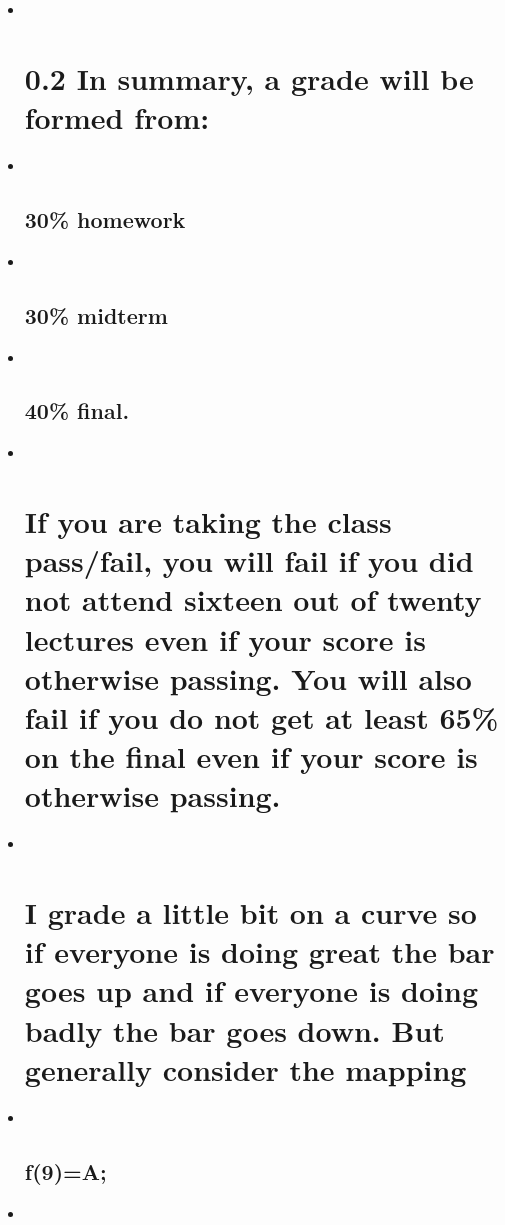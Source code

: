 \documentclass[11pt]{article}
\begin{document}
    \begin{itemize}
\item ~
  \section{0.2 In summary, a grade will be formed
  from:}\label{in-summary-a-grade-will-be-formed-from}
\item ~
  \subsection{30\% homework}\label{homework}
\item ~
  \subsection{30\% midterm}\label{midterm}
\item ~
  \subsection{40\% final.}\label{final.}
\item ~
  \section{If you are taking the class pass/fail, you will fail if you
  did not attend sixteen out of twenty lectures even if your score is
  otherwise passing. You will also fail if you do not get at least 65\%
  on the final even if your score is otherwise
  passing.}\label{if-you-are-taking-the-class-passfail-you-will-fail-if-you-did-not-attend-sixteen-out-of-twenty-lectures-even-if-your-score-is-otherwise-passing.-you-will-also-fail-if-you-do-not-get-at-least-65-on-the-final-even-if-your-score-is-otherwise-passing.}
\item ~
  \section{I grade a little bit on a curve so if everyone is doing great
  the bar goes up and if everyone is doing badly the bar goes down. But
  generally consider the
  mapping}\label{i-grade-a-little-bit-on-a-curve-so-if-everyone-is-doing-great-the-bar-goes-up-and-if-everyone-is-doing-badly-the-bar-goes-down.-but-generally-consider-the-mapping}
\item ~
  \subsection{f(9)=A;}\label{f9a}
\item ~

\end{itemize}
\end{document}
